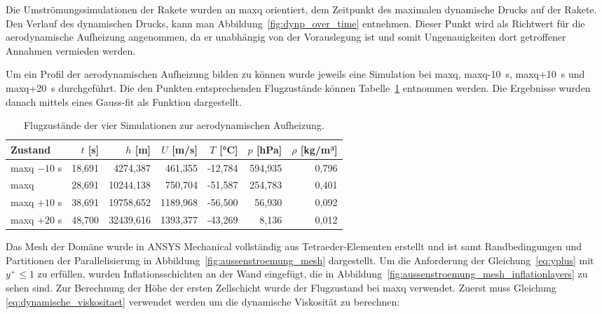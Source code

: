 Die Umströmungssimulationen der Rakete wurden an \ac{maxq} orientiert, dem Zeitpunkt des maximalen dynamische Drucks auf der Rakete.
Den Verlauf des dynamischen Drucks, kann man Abbildung~\ref{fig:dynp_over_time} entnehmen.
Dieser Punkt wird als Richtwert für die aerodynamische Aufheizung angenommen, da er unabhängig von der Vorauslegung ist und somit Ungenauigkeiten dort getroffener Annahmen vermieden werden.

Um ein Profil der aerodynamischen Aufheizung bilden zu können wurde jeweils eine Simulation bei \ac{maxq}, \ac{maxq}-\SI{10}{\second},
\ac{maxq}+\SI{10}{\second} und \ac{maxq}+\SI{20}{\second} durchgeführt. Die den Punkten entsprechenden Flugzustände können Tabelle~\ref{tab:simulation_flugzustand} entnommen werden.
Die Ergebnisse wurden danach mittels eines Gauss-fit als Funktion dargestellt.

\begin{table}[H]
  \centering
  \caption{Flugzustände der vier Simulationen zur aerodynamischen Aufheizung.}\label{tab:simulation_flugzustand}

  \begin{tabular}{lrrrrrr}
    \toprule[1pt]
    Zustand & $t$ [s] & $h$ [m] & $U$ [m/s] & $T$ [°C] & $p$ [hPa] & $\rho$ [kg/m³] \\
    \midrule[0.5pt]
    \ac{maxq} $-10$ s    & 18,691 & 4274,387  & 461,355  & -12,784 & 594,935 & 0,796 \\
    \ac{maxq}            & 28,691 & 10244,138 & 750,704  & -51,587 & 254,783 & 0,401 \\
    \ac{maxq} $+10$ s    & 38,691 & 19758,652 & 1189,968 & -56,500 & 56,930  & 0,092 \\
    \ac{maxq} $+20$ s    & 48,700 & 32439,616 & 1393,377 & -43,269 & 8,136   & 0,012 \\
    \bottomrule[1pt]
  \end{tabular}
\end{table}

Das Mesh der Domäne wurde in ANSYS Mechanical vollständig aus Tetraeder-Elementen erstellt und ist samt Randbedingungen und Partitionen der Parallelisierung in Abbildung~\ref{fig:aussenstroemung_mesh} dargestellt.
Um die Anforderung der Gleichung~\ref{eq:yplus} mit $y^+ \leq 1$ zu erfüllen, wurden Inflationsschichten an der Wand eingefügt, die in Abbildung~\ref{fig:aussenstroemung_mesh_inflationlayers}
zu sehen sind. Zur Berechnung der Höhe der ersten Zellschicht wurde der Flugzustand bei \ac{maxq} verwendet.
Zuerst muss Gleichung \ref{eq:dynamische_viskositaet} verwendet werden um die dynamische Viskosität zu berechnen:

